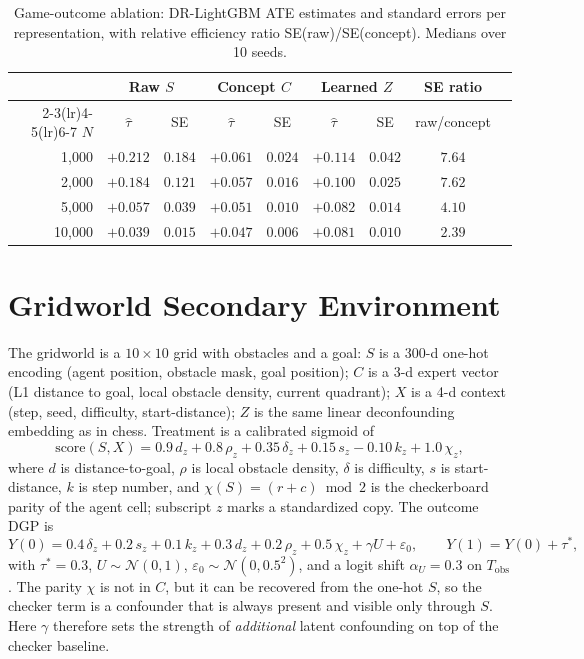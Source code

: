 \documentclass{article}
\begin{document}
\begin{table}[h]
\caption{Game-outcome ablation: DR-LightGBM ATE estimates and standard errors
per representation, with relative efficiency ratio SE(raw)/SE(concept).
Medians over 10 seeds.}
\label{tab:ablation}
\centering
\small
\begin{tabular}{rcccccccc}
\toprule
 & \multicolumn{2}{c}{Raw $S$} & \multicolumn{2}{c}{Concept $C$} & \multicolumn{2}{c}{Learned $Z$} & SE ratio \\
\cmidrule(lr){2-3}\cmidrule(lr){4-5}\cmidrule(lr){6-7}
$N$ & $\hat{\tau}$ & SE & $\hat{\tau}$ & SE & $\hat{\tau}$ & SE & raw/concept \\
\midrule
1{,}000  & $+0.212$ & $0.184$ & $+0.061$ & $0.024$ & $+0.114$ & $0.042$ & $\mathbf{7.64}$ \\
2{,}000  & $+0.184$ & $0.121$ & $+0.057$ & $0.016$ & $+0.100$ & $0.025$ & $\mathbf{7.62}$ \\
5{,}000  & $+0.057$ & $0.039$ & $+0.051$ & $0.010$ & $+0.082$ & $0.014$ & $\mathbf{4.10}$ \\
10{,}000 & $+0.039$ & $0.015$ & $+0.047$ & $0.006$ & $+0.081$ & $0.010$ & $\mathbf{2.39}$ \\
\bottomrule
\end{tabular}
\end{table}

\section{Gridworld Secondary Environment}
\label{app:gridworld}
The gridworld is a $10\times10$ grid with obstacles and a goal: $S$ is a
$300$-d one-hot encoding (agent position, obstacle mask, goal position); $C$
is a 3-d expert vector (L1 distance to goal, local obstacle density, current
quadrant); $X$ is a 4-d context (step, seed, difficulty, start-distance);
$Z$ is the same linear deconfounding embedding as in chess. Treatment is a
calibrated sigmoid of
\[
\text{score}(S,X)=0.9\,d_z+0.8\,\rho_z+0.35\,\delta_z+0.15\,s_z-0.10\,k_z+1.0\,\chi_z,
\]
where $d$ is distance-to-goal, $\rho$ is local obstacle density, $\delta$ is
difficulty, $s$ is start-distance, $k$ is step number, and
$\chi(S)=(r+c)\bmod 2$ is the checkerboard parity of the agent cell;
subscript $z$ marks a standardized copy. The outcome DGP is
\[
Y(0)=0.4\,\delta_z+0.2\,s_z+0.1\,k_z+0.3\,d_z+0.2\,\rho_z+0.5\,\chi_z+\gamma U+\varepsilon_0,
\qquad Y(1)=Y(0)+\tau^*,
\]
with $\tau^*=0.3$, $U\sim\mathcal{N}(0,1)$,
$\varepsilon_0\sim\mathcal{N}(0,0.5^2)$, and a logit shift $\alpha_U=0.3$ on
$T_{\text{obs}}$. The parity $\chi$ is not in $C$, but it can be recovered
from the one-hot $S$, so the checker term is a confounder that is always
present and visible only through $S$. Here $\gamma$ therefore sets the strength
of \emph{additional} latent confounding on top of the checker baseline.
\end{document}
